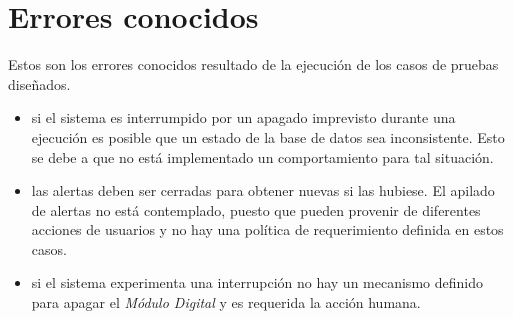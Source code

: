 \section{Errores conocidos}

Estos son los errores conocidos resultado de la ejecuci\'on de los casos de pruebas dise\~nados.


\begin{itemize}
    \item si el sistema es interrumpido por un apagado imprevisto durante una ejecuci\'on 
    es posible que un estado de la base de datos sea inconsistente. 
    Esto se debe a que no est\'a implementado un comportamiento para tal situaci\'on.
    
    \item las alertas deben ser cerradas para obtener nuevas si las hubiese. El apilado
    de alertas no est\'a contemplado, puesto que pueden provenir de diferentes acciones
    de usuarios y no hay una pol\'itica de requerimiento definida en estos casos.

    \item si el sistema experimenta una interrupci\'on no hay un mecanismo definido 
    para apagar el \textit{M\'odulo Digital} y es requerida la acci\'on humana.

\end{itemize}